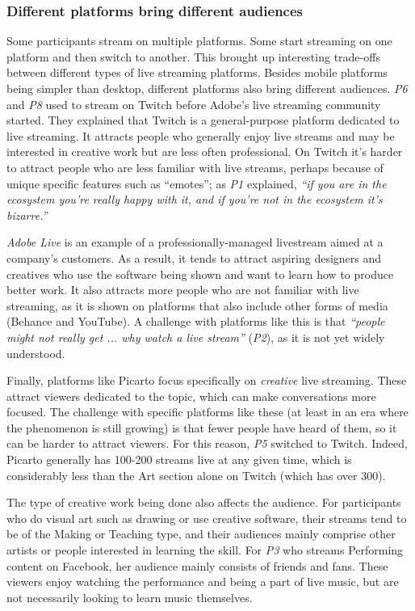 
\subsubsection{Different platforms bring different audiences}
Some participants stream on multiple platforms. Some start streaming on one platform and then switch to another. This brought up interesting trade-offs between different types of live streaming platforms. Besides mobile platforms being simpler than desktop, different platforms also bring different audiences. \textit{P6} and \textit{P8} used to stream on Twitch before Adobe's live streaming community started. They explained that Twitch is a general-purpose platform dedicated to live streaming. It attracts people who generally enjoy live streams and may be interested in creative work but are less often professional. On Twitch it's harder to attract people who are less familiar with live streams, perhaps because of unique specific features such as ``emotes''; as \textit{P1} explained, \textit{``if you are in the ecosystem you're really happy with it, and if you're not in the ecosystem it's bizarre.''}

\textit{Adobe Live} is an example of a professionally-managed live\-stream aimed at a company's customers. As a result, it tends to attract aspiring designers and creatives who use the software being shown and want to learn how to produce better work. It also attracts more people who are not familiar with live streaming, as it is shown on platforms that also include other forms of media (Behance and YouTube). A challenge with platforms like this is that \textit{``people might not really get ... why watch a live stream''} (\textit{P2}), as it is not yet widely understood.

Finally, platforms like Picarto focus specifically on \textit{creative} live streaming. These attract viewers dedicated to the topic, which can make conversations more focused. The challenge with specific platforms like these (at least in an era where the phenomenon is still growing) is that fewer people have heard of them, so it can be harder to attract viewers. For this reason, \textit{P5} switched to Twitch. Indeed, Picarto generally has 100-200 streams live at any given time, which is considerably less than the Art section alone on Twitch (which has over 300).

The type of creative work being done also affects the audience. For participants who do visual art such as drawing or use creative software, their streams tend to be of the Making or Teaching type, and their audiences mainly comprise other artists or people interested in learning the skill. For \textit{P3} who streams Performing content on Facebook, her audience mainly consists of friends and fans. These viewers enjoy watching the performance and being a part of live music, but are not necessarily looking to learn music themselves.
 
